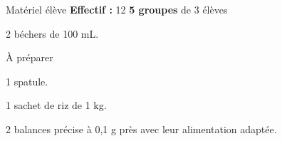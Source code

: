
\begin{boiteMateriel}{Matériel élève}
  \textbf{Effectif :} 12
  \qq{}\qq{}
  \flecheLongue \textbf{5 groupes} de 3 élèves

  \begin{protocole}
    \item 2 béchers de 100 mL.
  \end{protocole}
\end{boiteMateriel}


\begin{boiteMateriel}{À préparer}
  \begin{protocole}
    \item 1 spatule.
    \item 1 sachet de riz de 1 kg.
    \item 2 balances précise à 0,1 g près avec leur alimentation adaptée.
  \end{protocole}
\end{boiteMateriel}